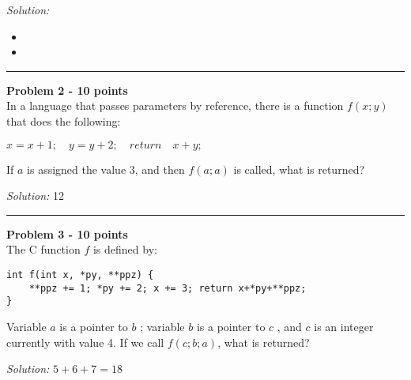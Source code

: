 \documentclass[a4paper, 11pt]{article}
\newenvironment{problem}[2][Problem]
    { \begin{mdframed}[backgroundcolor=gray!20] \textbf{#1 #2} \\}
    {  \end{mdframed}}
\newenvironment{solution}
    {\textit{Solution:}}
    {}
\begin{document}
\begin{solution}
\begin{itemize}[a]
    \item  
    \item 
\end{itemize}
\end{solution} 

\noindent\rule{7in}{2.8pt}


\begin{problem}{2 - 10 points}
In a language that passes parameters by reference, there is a  function $f(x;y)$ that does the following:  

$x = x + 1;\quad y = y + 2; \quad return \quad x+y;$  

\noindent If $a$ is assigned the value 3, and then $f(a;a)$ is called, what is returned? 
\end{problem}

\begin{solution}
12
\end{solution} 

\noindent\rule{7in}{2.8pt}


\begin{problem}{3 - 10 points}
The C function $f$ is defined by:  
\begin{verbatim}
int f(int x, *py, **ppz) {  
    **ppz += 1; *py += 2; x += 3; return x+*py+**ppz; 
} 
\end{verbatim}

\noindent Variable $a$ is a pointer to $b$ ; variable $b$ is a pointer to $c$ , and $c$ is an integer  currently with value 4. If we call $f ( c; b; a)$, what is returned? 

\end{problem}

\begin{solution}
$5 + 6 + 7 = 18$
\end{solution} 
\end{document}

